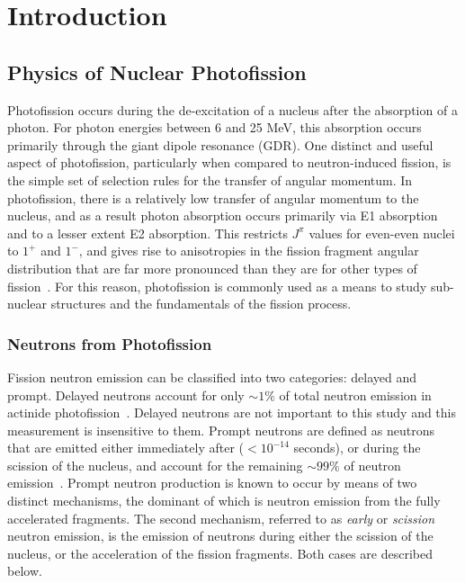 \chapter{Introduction}
\section{Physics of Nuclear Photofission}
Photofission occurs during the de-excitation of a nucleus after the absorption of a photon.
For photon energies between 6 and 25 MeV, this absorption occurs primarily through the giant dipole resonance (GDR).
One distinct and useful aspect of photofission, particularly when compared to neutron-induced fission, is the simple set of selection rules for the transfer of angular momentum.
In photofission, there is a relatively low transfer of angular momentum to the nucleus, and as a result photon absorption occurs primarily via E1 absorption and to a lesser extent E2 absorption.
This restricts $J^{\pi}$ values for even-even nuclei to $1^{+}$ and $1^{-}$, and gives rise to anisotropies in the fission fragment angular distribution that are far more pronounced than they are for other types of fission~\cite{1977FragAss}.
For this reason, photofission is commonly used as a means to study sub-nuclear structures and the fundamentals of the fission process.

\subsection{Neutrons from Photofission}
Fission neutron emission can be classified into two categories: delayed and prompt.
Delayed neutrons account for only $\sim1\%$ of total neutron emission in actinide photofission~\cite{Caldwell2017DelayedNs}.
Delayed neutrons are not important to this study and this measurement is insensitive to them.
Prompt neutrons are defined as neutrons that are emitted either immediately after ($<10^{-14}$ seconds), or during the scission of the nucleus, and account for the remaining $\sim99\%$ of neutron emission~\cite{Caldwell2017DelayedNs}.
Prompt neutron production is known to occur by means of two distinct mechanisms, the dominant of which is neutron emission from the fully accelerated fragments.
The second mechanism, referred to as \textit{early} or \textit{scission} neutron emission, is the emission of neutrons during either the scission of the nucleus, or the acceleration of the fission fragments.
Both cases are described below.

